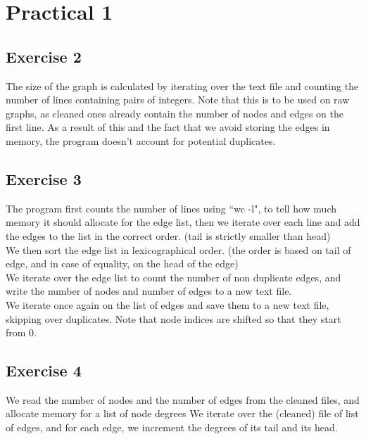 \documentclass{article}
\begin{document}
\section*{Practical 1}%
\subsection*{Exercise 2}%
\label{sub:tp1ex2}
The size of the graph is calculated by iterating over the text file and
counting the number of lines containing pairs of integers.
Note that this is to be used on raw graphs, as cleaned ones already contain the
number of nodes and edges on the first line.
As a result of this and the fact that we avoid storing the edges in memory, the
program doesn't account for potential duplicates.

\subsection*{Exercise 3}%
\label{sub:tp1ex3}
The program first counts the number of lines using ``wc -l", to tell how much
memory it should allocate for the edge list, then we iterate over each line
and add the edges to the list in the correct order.
(tail is strictly smaller than head)\\
We then sort the edge list in lexicographical order.
(the order is based on tail of edge, and in case of equality, on the head of the
edge)\\
We iterate over the edge list to count the number of non duplicate edges,
and write the number of nodes and number of edges to a new text file.\\
We iterate once again on the list of edges and save them to a new text file,
skipping over duplicates. Note that node indices are shifted so that they start
from 0.

\subsection*{Exercise 4}%
\label{sub:tp1ex4}
We read the number of nodes and the number of edges from the cleaned files, and
allocate memory for a list of node degrees
We iterate over the (cleaned) file of list of edges, and for each edge, we
increment the degrees of its tail and its head.
\end{document}
